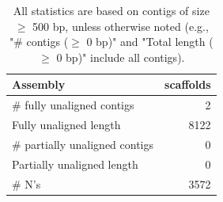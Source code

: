 \documentclass[12pt,a4paper]{article}
\begin{document}
\begin{table}[ht]
\begin{center}
\caption{All statistics are based on contigs of size $\geq$ 500 bp, unless otherwise noted (e.g., "\# contigs ($\geq$ 0 bp)" and "Total length ($\geq$ 0 bp)" include all contigs).}
\begin{tabular}{|l*{1}{|r}|}
\hline
Assembly & scaffolds \\ \hline
\# fully unaligned contigs & 2 \\ \hline
Fully unaligned length & 8122 \\ \hline
\# partially unaligned contigs & 0 \\ \hline
Partially unaligned length & 0 \\ \hline
\# N's & 3572 \\ \hline
\end{tabular}
\end{center}
\end{table}
\end{document}
